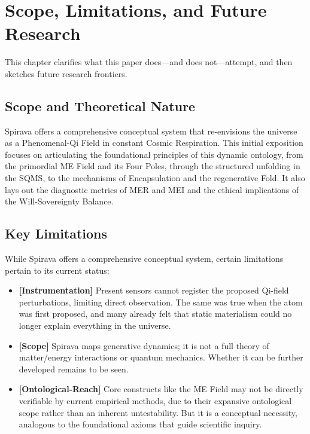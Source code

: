 \documentclass[11pt, a4paper]{article}
\begin{document}
\section{Scope, Limitations, and Future Research}
This chapter clarifies what this paper does—and does not—attempt, and then sketches future research frontiers.

\subsection{Scope and Theoretical Nature}
Spirava offers a comprehensive conceptual system that re-envisions the universe as a Phenomenal-Qi Field in constant Cosmic Respiration. This initial exposition focuses on articulating the foundational principles of this dynamic ontology, from the primordial ME Field and its Four Poles, through the structured unfolding in the SQMS, to the mechanisms of Encapsulation and the regenerative Fold. It also lays out the diagnostic metrics of MER and MEI and the ethical implications of the Will-Sovereignty Balance.

\subsection{Key Limitations}
While Spirava offers a comprehensive conceptual system, certain limitations pertain to its current status:
\begin{itemize}
    \item \textbf{[Instrumentation]} Present sensors cannot register the proposed Qi-field perturbations, limiting direct observation. The same was true when the atom was first proposed, and many already felt that static materialism could no longer explain everything in the universe.
    \item \textbf{[Scope]} Spirava maps generative dynamics; it is not a full theory of matter/energy interactions or quantum mechanics. Whether it can be further developed remains to be seen.
    \item \textbf{[Ontological-Reach]} Core constructs like the ME Field may not be directly verifiable by current empirical methods, due to their expansive ontological scope rather than an inherent untestability. But it is a conceptual necessity, analogous to the foundational axioms that guide scientific inquiry.
\end{itemize}
\end{document}
